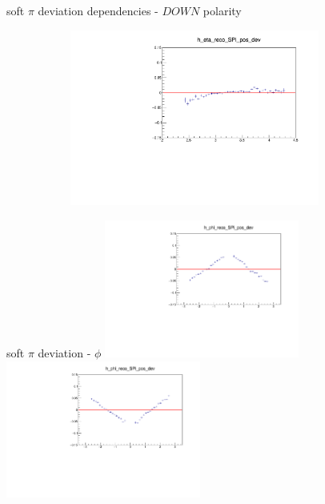 \documentclass[11pt]{beamer}
\begin{document}
\begin{frame}{soft $\pi$ deviation dependencies - $DOWN$ polarity}
\begin{figure}
\begin{subfigure}{0.45\textwidth}
\end{subfigure}
\begin{subfigure}{0.45\textwidth}
\includegraphics[width=0.9\textwidth]{fourth/down_pdf/deviation/h_eta_reco_SPi_pos_dev.pdf}
\end{subfigure}
\end{figure}
\end{frame}
\begin{frame}{soft $\pi$ deviation - $\phi$}
\centering
\includegraphics[width=0.48\textwidth]{fourth/up_pdf/deviation/h_phi_reco_SPi_pos_dev.pdf}
\includegraphics[width=0.48\textwidth]{fourth/down_pdf/deviation/h_phi_reco_SPi_pos_dev.pdf}
\end{frame}
\end{document}
